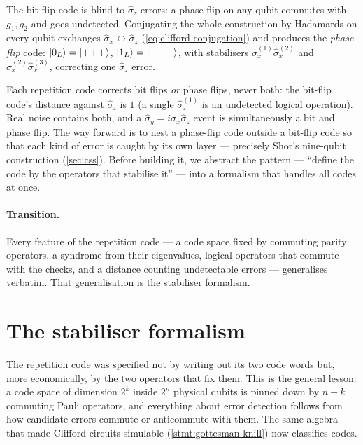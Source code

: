 \begin{statement}
\label{stmt:phase-flip}
The bit-flip code is blind to $\hat\sigma_z$ errors: a phase flip on any
qubit commutes with $g_1,g_2$ and goes undetected. Conjugating the whole
construction by Hadamards on every qubit exchanges
$\hat\sigma_x\leftrightarrow\hat\sigma_z$
(\cref{eq:clifford-conjugation}) and produces the \emph{phase-flip}
code: $\ket{0_L}=\ket{+\!+\!+}$, $\ket{1_L}=\ket{-\!-\!-}$, with
stabilisers $\hat\sigma_x^{(1)}\hat\sigma_x^{(2)}$ and
$\hat\sigma_x^{(2)}\hat\sigma_x^{(3)}$, correcting one $\hat\sigma_z$
error.
\end{statement}

\begin{example}
\label{ex:rep-insufficient}
Each repetition code corrects bit flips \emph{or} phase flips, never
both: the bit-flip code's distance against $\hat\sigma_z$ is $1$ (a
single $\hat\sigma_z^{(1)}$ is an undetected logical operation). Real
noise contains both, and a $\hat\sigma_y=i\hat\sigma_x\hat\sigma_z$ event
is simultaneously a bit and phase flip. The way forward is to nest a
phase-flip code outside a bit-flip code so that each kind of error is
caught by its own layer --- precisely Shor's nine-qubit construction
(\cref{sec:css}). Before building it, we abstract the pattern ---
``define the code by the operators that stabilise it'' --- into a
formalism that handles all codes at once.
\end{example}

\paragraph{Transition.}
Every feature of the repetition code --- a code space fixed by commuting
parity operators, a syndrome from their eigenvalues, logical operators
that commute with the checks, and a distance counting undetectable
errors --- generalises verbatim. That generalisation is the stabiliser
formalism.

\section{The stabiliser formalism}
\label{sec:stabiliser}

\begin{phenomenon}
The repetition code was specified not by writing out its two code words
but, more economically, by the two operators that fix them. This is the
general lesson: a code space of dimension $2^k$ inside $2^n$ physical
qubits is pinned down by $n-k$ commuting Pauli operators, and everything
about error detection follows from how candidate errors commute or
anticommute with them. The same algebra that made Clifford circuits
simulable (\cref{stmt:gottesman-knill}) now classifies codes.
\end{phenomenon}

